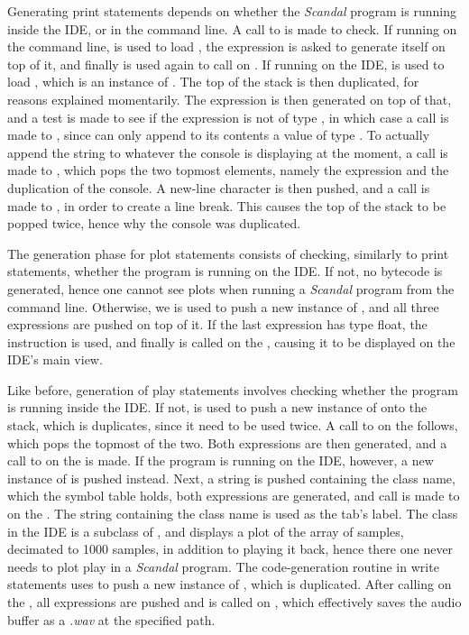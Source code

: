 Generating print statements depends on whether the \emph{Scandal} program is running inside the IDE, or in the command line. A call to  is made to check. If running on the command line,  is used to load , the expression is asked to generate itself on top of it, and finally  is used again to call  on . If running on the IDE,  is used to load , which is an instance of . The top of the stack is then duplicated, for reasons explained momentarily. The expression is then generated on top of that, and a test is made to see if the expression is not of type , in which case a call is made to , since  can only append to its contents a value of type . To actually append the string to whatever the console is displaying at the moment, a call is made to , which pops the two topmost elements, namely the expression and the duplication of the console. A new-line character is then pushed, and a call is made to , in order to create a line break. This causes the top of the stack to be popped twice, hence why the console was duplicated.

The generation phase for plot statements consists of checking, similarly to print statements, whether the program is running on the IDE. If not, no bytecode is generated, hence one cannot see plots when running a \emph{Scandal} program from the command line. Otherwise, we  is used to push a new instance of , and all three expressions are pushed on top of it. If the last expression has type float, the  instruction is used, and finally  is called on the , causing it to be displayed on the IDE's main view.

Like before, generation of play statements involves checking whether the program is running inside the IDE. If not,  is used to push a new instance of  onto the stack, which is duplicates, since it need to be used twice. A call to  on the  follows, which pops the topmost of the two. Both expressions are then generated, and a call to  on the  is made. If the program is running on the IDE, however, a new instance of  is pushed instead. Next, a string is pushed containing the class name, which the symbol table holds, both expressions are generated, and call is made to  on the . The string containing the class name is used as the tab's label. The  class in the IDE is a subclass of , and displays a plot of the array of samples, decimated to 1000 samples, in addition to playing it back, hence there one never needs to plot  play in a \emph{Scandal} program. The code-generation routine in write statements uses  to push a new instance of , which is duplicated. After calling  on the , all expressions are pushed and  is called on , which effectively saves the audio buffer as a \emph{.wav} at the specified path.

